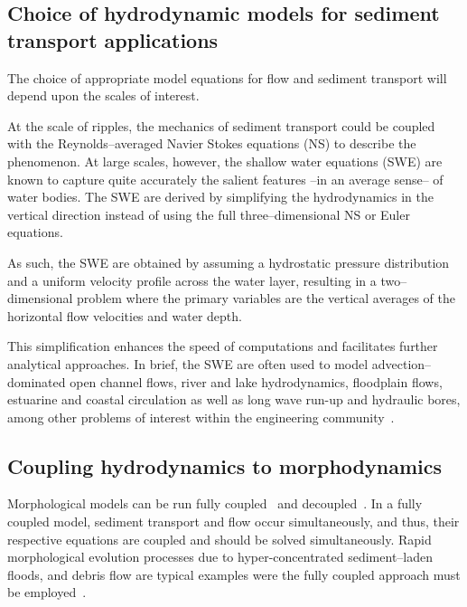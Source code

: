 \subsection{Choice of hydrodynamic models for sediment transport applications}
The choice of appropriate model equations for flow and sediment transport
will depend upon the scales of interest.

At the scale of ripples, the mechanics of sediment transport could be coupled with the
Reynolds--averaged Navier Stokes equations (NS) to describe the phenomenon.
At large scales, however, the shallow water equations (SWE) are known to
capture quite accurately the salient features --in an average sense-- of
water bodies. The SWE are derived by simplifying the hydrodynamics in the vertical
direction instead of using the full three--dimensional NS or Euler
equations.

As such, the SWE are obtained by assuming a hydrostatic pressure
distribution and a uniform velocity profile across the water layer,
resulting in a two--dimensional problem where the primary variables are the
vertical averages of the horizontal flow velocities and water depth.

This simplification enhances the speed of computations and
facilitates further analytical approaches. In brief, the SWE are often
used to model advection--dominated open channel flows, river and lake
hydrodynamics, floodplain flows, estuarine and coastal circulation as well
as long wave run-up and hydraulic bores, among
other problems of interest within the engineering community~\cite{Vreugdenhil:94}.


\subsection{Coupling hydrodynamics to morphodynamics}
Morphological models can be run fully coupled~\cite{cao02} and decoupled~\cite{vriend87}. In a fully coupled model, sediment
transport and flow occur simultaneously, and thus, their respective
equations are coupled and should be solved simultaneously. Rapid morphological evolution processes due
to hyper-concentrated sediment--laden floods, and debris flow are typical
examples were the fully coupled approach must be employed~\cite{Frac02}.


